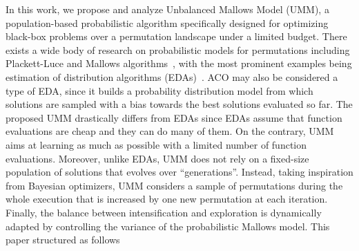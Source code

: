 \documentclass[runningheads]{llncs}
\begin{document}
In this work, we propose and analyze Unbalanced Mallows Model (UMM), a
population-based probabilistic algorithm specifically designed for optimizing
black-box problems over a permutation landscape under a limited budget. There
exists a wide body of research on probabilistic models for permutations including  Plackett-Luce and Mallows
algorithms~\citep{???},
with the most prominent examples being estimation of distribution algorithms
(EDAs)~\cite{Ceberio2013}.  ACO may also be considered a type of EDA, since
it builds a probability distribution model from which solutions are sampled
with a bias towards the best solutions evaluated so far. The proposed UMM
drastically differs from EDAs since EDAs assume that function evaluations are
cheap and they can do many of them. On the contrary, UMM aims at learning as
much as possible with a limited number of function evaluations. Moreover,
unlike EDAs, UMM does not rely on a fixed-size population of solutions that
evolves over ``generations''. Instead, taking inspiration from Bayesian
optimizers, UMM considers a sample of permutations during the whole execution
that is increased by one new permutation at each iteration. Finally,
the balance between intensification and exploration is dynamically adapted by
controlling the variance of the probabilistic Mallows model.  
This paper structured as follows 



\end{document}
